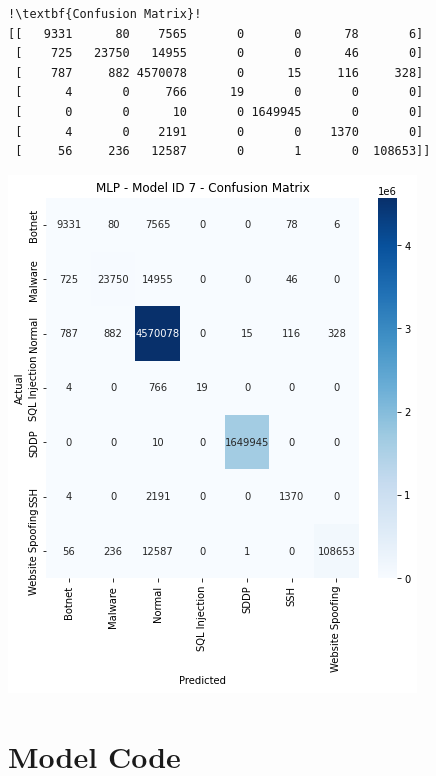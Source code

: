 \begin{appendices}
\begin{lstlisting}[escapechar=!]
!\textbf{Confusion Matrix}!    
[[   9331      80    7565       0       0      78       6]
 [    725   23750   14955       0       0      46       0]
 [    787     882 4570078       0      15     116     328]
 [      4       0     766      19       0       0       0]
 [      0       0      10       0 1649945       0       0]
 [      4       0    2191       0       0    1370       0]
 [     56     236   12587       0       1       0  108653]]

\end{lstlisting}

\begin{center}
	\includegraphics[width=\textwidth]{Appendices/Images/MLP/Model7/MLP_Model7_CM.png}
\end{center}


\section{Model Code}
\label{appx: Model Code}


\end{appendices}
